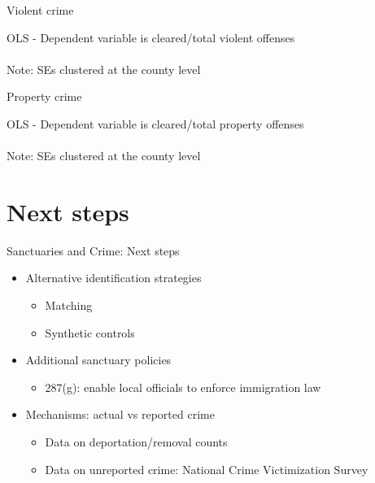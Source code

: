 \documentclass[xcolor=pdftex,dvipsnames,table,handout]{beamer}
\newcommand{\tablesfolder}{/Users/bbiasi/Dropbox/Research/sanctuaries/sanctuaries_git/tex/tables}
\begin{document}
\begin{frame}{Violent crime}
\footnotesize
\begin{center}
OLS - Dependent variable is cleared/total violent offenses\\

\\\footnotesize{Note: SEs clustered at the county level}
\end{center}
\end{frame}

\begin{frame}{Property crime}
\footnotesize
\begin{center}
OLS - Dependent variable is cleared/total property offenses\\

\\\footnotesize{Note: SEs clustered at the county level}
\end{center}
\end{frame}

\section{Next steps}
\begin{frame}{Sanctuaries and Crime: Next steps}
\pause
\begin{itemize}
\item Alternative identification strategies\vspace{0.10cm}
\begin{itemize}
\item Matching\vspace{0.10cm}
\item Synthetic controls
\end{itemize}\vspace{0.20cm}\pause
\item Additional sanctuary policies\vspace{0.10cm}
\begin{itemize}
\item 287(g): enable local officials to enforce immigration law
\end{itemize}\vspace{0.20cm}\pause
\item Mechanisms: actual vs reported crime\vspace{0.10cm}
\begin{itemize}
\item Data on deportation/removal counts\vspace{0.10cm}
\item Data on unreported crime: National Crime Victimization Survey
\end{itemize}
\end{itemize}
\end{frame}
\end{document}
